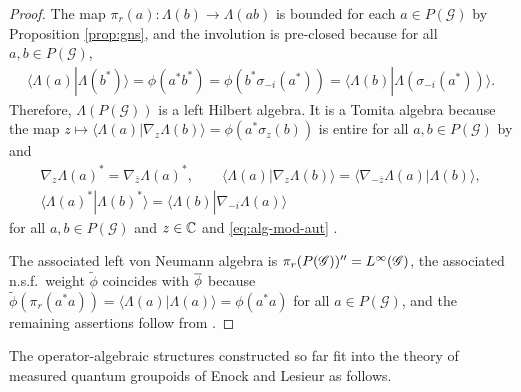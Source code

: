 \begin{proof}
The map $\pi_{r}(a)\colon \Lambda(b) \to \Lambda(ab)$ is bounded for
  each $a \in P(\mathscr{G})$ by Proposition \ref{prop:gns}, and the
  involution is pre-closed because for all $a,b \in P(\mathscr{G})$,
  \begin{align*}
    \langle \Lambda(a)|\Lambda(b^{*})\rangle = \phi(a^{*}b^{*}) =
    \phi(b^{*}\sigma_{-i}(a^{*})) = \langle
    \Lambda(b)|\Lambda(\sigma_{-i}(a^{*}))\rangle.
  \end{align*}
  Therefore, $\Lambda(P(\mathscr{G}))$ is a left Hilbert algebra. It
  is a Tomita algebra because the
  map $z\mapsto \langle \Lambda(a)|\nabla_{z}\Lambda(b)\rangle =
  \phi(a^{*}\sigma_{z}(b))$ is entire for all $a,b\in P(\mathscr{G})$  by
 \cite[Theorem 3.49]{DCT1}
  and
  \begin{gather*}
    \nabla_{z}\Lambda(a)^{*} = \nabla_{\overline{z}}\Lambda(a)^{*}, \qquad
    \langle \Lambda(a)|\nabla_{z}\Lambda(b)\rangle = \langle
    \nabla_{-\overline{z}}\Lambda(a) |\Lambda(b)\rangle, \\ \langle
    \Lambda(a)^{*}|\Lambda(b)^{*}\rangle = \langle \Lambda(b)|\nabla_{-i}\Lambda(a)\rangle
  \end{gather*}
  for all $a,b\in P(\mathscr{G})$ and $z\in \mathbb{C}$ and  \eqref{eq:alg-mod-aut} . 

 The associated left von Neumann algebra is $\pi_{r}(P(\mathscr{G}))''=L^{\infty}(\mathscr{G})$, the
 associated n.s.f.\ weight $\tilde\phi$ coincides with $\overline{\phi}$ because
 $\tilde \phi(\pi_{r}(a^{*}a))=\langle\Lambda(a)|\Lambda(a)\rangle =
 \phi(a^{*}a)$ for all $a\in P(\mathscr{G})$,  and the remaining
 assertions follow  from
  \cite[Theorem VI.2.2 and its proof]{Taksak2}.
\end{proof}


The operator-algebraic structures constructed so far fit into the
theory of measured quantum groupoids of Enock and Lesieur \cite{Eno2,Les1} as follows.

